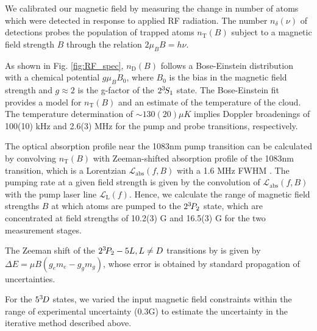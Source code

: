 {We calibrated our magnetic field by measuring the change in number of atoms which were detected in response to applied RF radiation.
The number $n_\delta(\nu)$ of detections probes the population of trapped atoms $n_\text{T}(B)$ subject to a magnetic field strength $B$ through the relation $2 \mu_B B = h \nu$.
	
As shown in Fig.
	\ref{fig:RF_spec}, $n_\text{D}(B)$ follows a Bose-Einstein distribution with a chemical potential $g \mu_B B_0$, where $B_0$ is the bias in the magnetic field strength and $g\approx2$ is the g-factor of the $2^{3\!} S_1$ state.
The Bose-Einstein fit provides a model for $n_\text{T}(B)$ and an estimate of the temperature of the cloud.
	The temperature determination of $\sim130(20)\mu K$ implies Doppler broadenings of 100(10) kHz and 2.6(3) MHz for the pump and probe transitions, respectively.

The optical absorption profile near the 1083nm pump transition can be calculated by convolving $n_\text{T}(B)$ with Zeeman-shifted absorption profile of the 1083nm transition, which is a Lorentzian $\mathcal{L}_\text{abs}(f,B)$ with a 1.6 MHz FWHM \cite{Drake07}.
The pumping rate at a given field strength is given by the convolution of $\mathcal{L}_\text{abs}(f,B)$ with the pump laser line $\mathcal{L}_\text{L}(f)$.
Hence, we calculate the range of magnetic field strengths $B$ at which atoms are pumped to the $2^{3\!} P_2$ state, which are concentrated at field strengths of 10.2(3) G and 16.5(3) G for the two measurement stages.
	
The Zeeman shift of the $2^{3\!} P_2 - 5L, L\neq D$ transitions by is given by $\Delta E = \mu B (g_e m_e-g_g m_g)$, whose error is obtained by standard propagation of uncertainties.
	
For the $5^{3\!} D$ states, we varied the input magnetic field constraints within the range of experimental uncertainty ($0.3$G) to estimate the uncertainty in the iterative method described above.}


